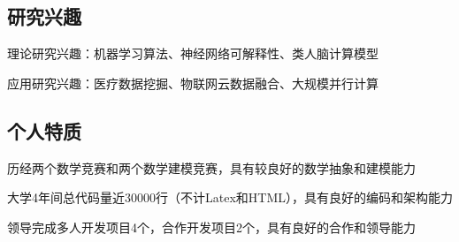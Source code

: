\documentclass[]{deedy-resume-openfont}
\begin{document}
\begin{minipage}[t]{0.73\textwidth}
    \subsection{研究兴趣}
    \vspace{\topsep}
	\begin{tightemize}
		\item 理论研究兴趣：机器学习算法、神经网络可解释性、类人脑计算模型
		\item 应用研究兴趣：医疗数据挖掘、物联网云数据融合、大规模并行计算
	\end{tightemize}
    \subsection{个人特质}
    \vspace{\topsep}
    \begin{tightemize}
        \item 历经两个数学竞赛和两个数学建模竞赛，具有较良好的数学抽象和建模能力
		\item 大学4年间总代码量近30000行（不计Latex和HTML），具有良好的编码和架构能力
		\item 领导完成多人开发项目4个，合作开发项目2个，具有良好的合作和领导能力
	\end{tightemize}
\end{minipage}
\end{document}
